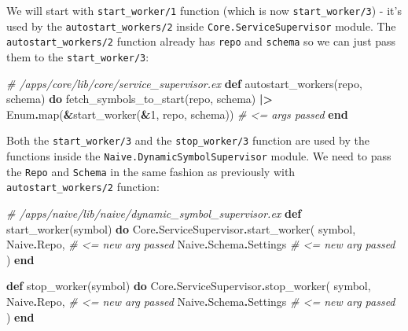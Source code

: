 \documentclass[
]{book}
\newenvironment{Shaded}{\begin{snugshade}}{\end{snugshade}}
\newcommand{\CommentTok}[1]{\textcolor[rgb]{0.56,0.35,0.01}{\textit{#1}}}
\newcommand{\ConstantTok}[1]{\textcolor[rgb]{0.00,0.00,0.00}{#1}}
\newcommand{\DecValTok}[1]{\textcolor[rgb]{0.00,0.00,0.81}{#1}}
\newcommand{\KeywordTok}[1]{\textcolor[rgb]{0.13,0.29,0.53}{\textbf{#1}}}
\newcommand{\NormalTok}[1]{#1}
\newcommand{\OperatorTok}[1]{\textcolor[rgb]{0.81,0.36,0.00}{\textbf{#1}}}
\begin{document}
We will start with \texttt{start\_worker/1} function (which is now \texttt{start\_worker/3}) - it's used by the \texttt{autostart\_workers/2} inside \texttt{Core.ServiceSupervisor} module. The \texttt{autostart\_workers/2} function already has \texttt{repo} and \texttt{schema} so we can just pass them to the \texttt{start\_worker/3}:

\begin{Shaded}
\begin{Highlighting}[]
  \CommentTok{\# /apps/core/lib/core/service\_supervisor.ex}
  \KeywordTok{def}\NormalTok{ autostart\_workers(repo, schema) }\KeywordTok{do}
\NormalTok{    fetch\_symbols\_to\_start(repo, schema)}
    \OperatorTok{|\textgreater{}} \ConstantTok{Enum}\OperatorTok{.}\NormalTok{map(}\OperatorTok{\&}\NormalTok{start\_worker(}\OperatorTok{\&}\DecValTok{1}\NormalTok{, repo, schema)) }\CommentTok{\# \textless{}= args passed}
  \KeywordTok{end}
\end{Highlighting}
\end{Shaded}

Both the \texttt{start\_worker/3} and the \texttt{stop\_worker/3} function are used by the functions inside the \texttt{Naive.DynamicSymbolSupervisor} module. We need to pass the \texttt{Repo} and \texttt{Schema} in the same fashion as previously with \texttt{autostart\_workers/2} function:

\begin{Shaded}
\begin{Highlighting}[]
  \CommentTok{\# /apps/naive/lib/naive/dynamic\_symbol\_supervisor.ex}
  \KeywordTok{def}\NormalTok{ start\_worker(symbol) }\KeywordTok{do}
    \ConstantTok{Core}\OperatorTok{.}\ConstantTok{ServiceSupervisor}\OperatorTok{.}\NormalTok{start\_worker(}
\NormalTok{      symbol,}
      \ConstantTok{Naive}\OperatorTok{.}\ConstantTok{Repo}\NormalTok{,            }\CommentTok{\# \textless{}= new arg passed}
      \ConstantTok{Naive}\OperatorTok{.}\ConstantTok{Schema}\OperatorTok{.}\ConstantTok{Settings}  \CommentTok{\# \textless{}= new arg passed}
\NormalTok{    )}
  \KeywordTok{end}

  \KeywordTok{def}\NormalTok{ stop\_worker(symbol) }\KeywordTok{do}
    \ConstantTok{Core}\OperatorTok{.}\ConstantTok{ServiceSupervisor}\OperatorTok{.}\NormalTok{stop\_worker(}
\NormalTok{      symbol,}
      \ConstantTok{Naive}\OperatorTok{.}\ConstantTok{Repo}\NormalTok{,           }\CommentTok{\# \textless{}= new arg passed}
      \ConstantTok{Naive}\OperatorTok{.}\ConstantTok{Schema}\OperatorTok{.}\ConstantTok{Settings} \CommentTok{\# \textless{}= new arg passed}
\NormalTok{    )}
  \KeywordTok{end}
\end{Highlighting}
\end{Shaded}
\end{document}
